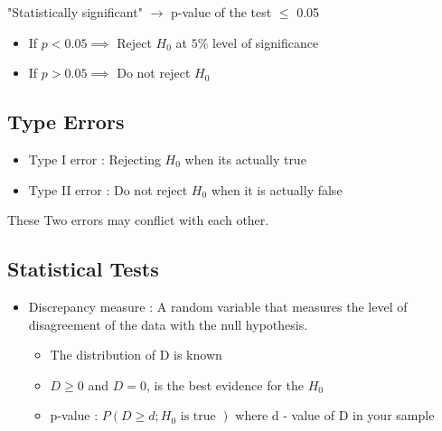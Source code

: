 \documentclass{article}
\begin{document}
"Statistically significant" \(\rightarrow\) p-value of the test \(\leq\) 0.05

\begin{itemize}
\item If \(p < 0.05 \implies\) Reject \(H_0\) at \(5\%\) level of significance
\item If \(p > 0.05 \implies\) Do not reject \(H_0\)
\end{itemize}

\subsection*{Type Errors}
\begin{itemize}
\item Type I error : Rejecting \(H_0\) when its actually true 
\item Type II error : Do not reject \(H_0\) when it is actually false
\end{itemize}
These Two errors may conflict with each other. 

\subsection*{Statistical Tests}
\begin{itemize}
\item Discrepancy measure : A random variable that measures the level of disagreement of the data with the null hypothesis. 
\begin{itemize}
\item The distribution of D is known 
\item \(D \geq 0\) and \(D = 0\), is the best evidence for the \(H_0\) 
\item p-value : \(P(D \geq d; H_0 \text{ is true } )\) where d - value of D in your sample 

\end{itemize}
\end{itemize}
\end{document}
